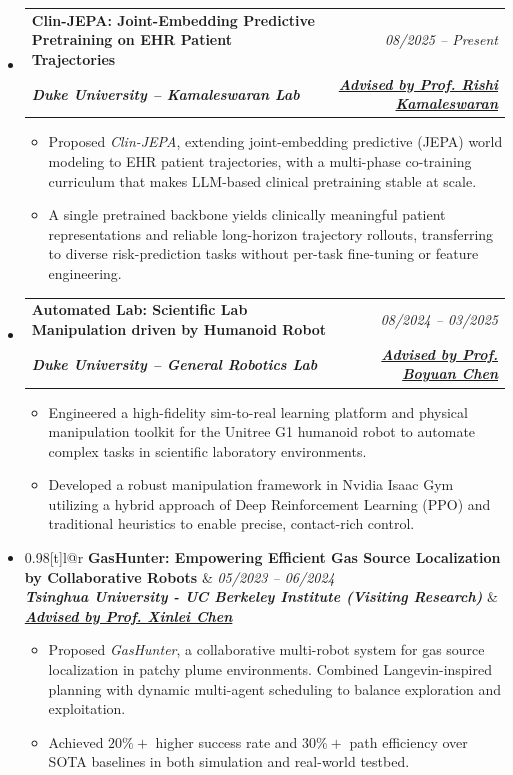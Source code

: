 \documentclass[a4paper,11pt]{article}
\makeatletter
\newcommand{\resumeSubheading}[4]{
\item
  \begin{tabular*}{0.98\textwidth}[t]{l@{\extracolsep{\fill}}r}
    \textbf{#1} & \textit{\footnotesize{#4}} \\
    \textit{\footnotesize{#3}} & \footnotesize{#2}\\
  \end{tabular*}
  \vspace{0.5mm}
}
\makeatother
\begin{document}
\begin{itemize}[leftmargin=0in, label={}]

    \resumeSubheading
    {Clin-JEPA: Joint-Embedding Predictive Pretraining on EHR Patient Trajectories \hspace{-40mm}}{\href{https://www.kamaleswaran.com/team}{\textit{\textbf{Advised by Prof. Rishi Kamaleswaran}}}}
    {\textup{\textbf{Duke University -- Kamaleswaran Lab}}}{08/2025 -- Present}
    \begin{itemize}
      \item {\footnotesize Proposed \textit{Clin-JEPA}, extending joint-embedding predictive (JEPA) world modeling to EHR patient trajectories, with a multi-phase co-training curriculum that makes LLM-based clinical pretraining stable at scale.}
      \item {\footnotesize A single pretrained backbone yields clinically meaningful patient representations and reliable long-horizon trajectory rollouts, transferring to diverse risk-prediction tasks without per-task fine-tuning or feature engineering.}
    \end{itemize}

    \resumeSubheading
    {Automated Lab: Scientific Lab Manipulation driven by Humanoid Robot}{\href{http://boyuanchen.com/index.html}{\textit{\textbf{Advised by Prof. Boyuan Chen}}}}
    {\textup{\textbf{Duke University -- General Robotics Lab}}}{08/2024 -- 03/2025}
    \begin{itemize}
      \item {\footnotesize Engineered a high-fidelity sim-to-real learning platform and physical manipulation toolkit for the Unitree G1 humanoid robot to automate complex tasks in scientific laboratory environments.}
      \item {\footnotesize Developed a robust manipulation framework in Nvidia Isaac Gym utilizing a hybrid approach of Deep Reinforcement Learning (PPO) and traditional heuristics to enable precise, contact-rich control.}
    \end{itemize}

    \resumeSubheading
    {GasHunter: Empowering Efficient Gas Source Localization by Collaborative Robots \hspace{-40mm}}{\href{https://scholar.google.com/citations?user=Ha8rlUgAAAAJ&hl=en}{\textit{\textbf{Advised by Prof. Xinlei Chen}}}}
    {\textup{\textbf{Tsinghua University - UC Berkeley Institute (Visiting Research)}}}{05/2023 -- 06/2024}
    \begin{itemize}
      \item {\footnotesize Proposed \textit{GasHunter}, a collaborative multi-robot system for gas source localization in patchy plume environments. Combined Langevin-inspired planning with dynamic multi-agent scheduling to balance exploration and exploitation.}
      \item {\footnotesize Achieved $20\%+$ higher success rate and $30\%+$ path efficiency over SOTA baselines in both simulation and real-world testbed.}
    \end{itemize}


\end{itemize}
\end{document}
